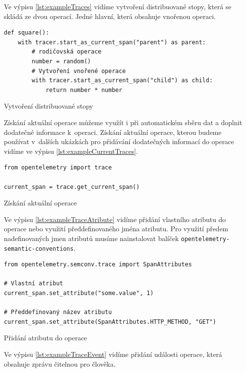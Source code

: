 Ve výpisu \ref{lst:exampleTraces} vidíme vytvoření distribuované stopy, která se skládá ze dvou operací. Jedné hlavní, která obsahuje vnořenou operaci.

\begin{listing}[H]
    \begin{verbatim}
def square():
    with tracer.start_as_current_span("parent") as parent:
        # rodičovská operace
        number = random()
        # Vytvoření vnořené operace
        with tracer.start_as_current_span("child") as child:
            return number * number
\end{verbatim}
    \caption{Vytvoření distribuované stopy}
    \label{lst:exampleTraces}
\end{listing}

Získání aktuální operace můžeme využít i při automatickém sběru dat a doplnit dodatečné informace k~operaci. Získání aktuální operace, kterou budeme používat v~dalších ukázkách pro přidávání dodatečných informací do operace vidíme ve výpisu \ref{lst:exampleCurrentTraces}.
\begin{listing}[H]
    \begin{verbatim}
from opentelemetry import trace

current_span = trace.get_current_span()
\end{verbatim}
    \caption{Získání aktuální operace}
    \label{lst:exampleCurrentTraces}
\end{listing}
Ve výpisu \ref{lst:exampleTraceAtribute} vidíme přidání vlastního atributu do operace nebo využití předdefinovaného jména atributu. Pro využití předem nadefinovaných jmen atributů musíme nainstalovat balíček \texttt{opentelemetry-semantic-conventions}.

\begin{listing}[H]
    \begin{verbatim}
from opentelemetry.semconv.trace import SpanAttributes
    
# Vlastní atribut    
current_span.set_attribute("some.value", 1)

# Předdefinovaný název atributu
current_span.set_attribute(SpanAttributes.HTTP_METHOD, "GET")
\end{verbatim}
    \caption{Přidání atributu do operace}
    \label{lst:exampleTraceAtribute}
\end{listing}

Ve výpisu \ref{lst:exampleTraceEvent} vidíme přidání události operace, která obsahuje zprávu čitelnou pro člověka.


